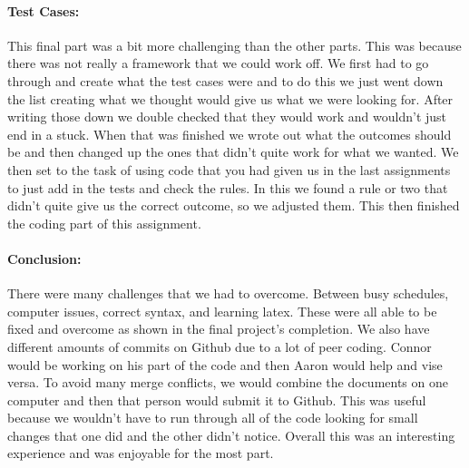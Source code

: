\documentclass{article}
\begin{document}
\paragraph{Test Cases:}
This final part was a bit more challenging than the other parts. This was because there was not really a framework that we could work off. We first had to go through and create what the test cases were and to do this we just went down the list creating what we thought would give us what we were looking for. After writing those down we double checked that they would work and wouldn’t just end in a stuck. When that was finished we wrote out what the outcomes should be and then changed up the ones that didn’t quite work for what we wanted. We then set to the task of using code that you had given us in the last assignments to just add in the tests and check the rules. In this we found a rule or two that didn’t quite give us the correct outcome, so we adjusted them. This then finished the coding part of this assignment. 

\paragraph{Conclusion:}
There were many challenges that we had to overcome. Between busy schedules, computer issues, correct syntax, and learning latex. These were all able to be fixed and overcome as shown in the final project’s completion. We also have different amounts of commits on Github due to a lot of peer coding. Connor would be working on his part of the code and then Aaron would help and vise versa. To avoid many merge conflicts, we would combine the documents on one computer and then that person would submit it to Github. This was useful because we wouldn’t have to run through all of the code looking for small changes that one did and the other didn’t notice. Overall this was an interesting experience and was enjoyable for the most part.
\end{document}
